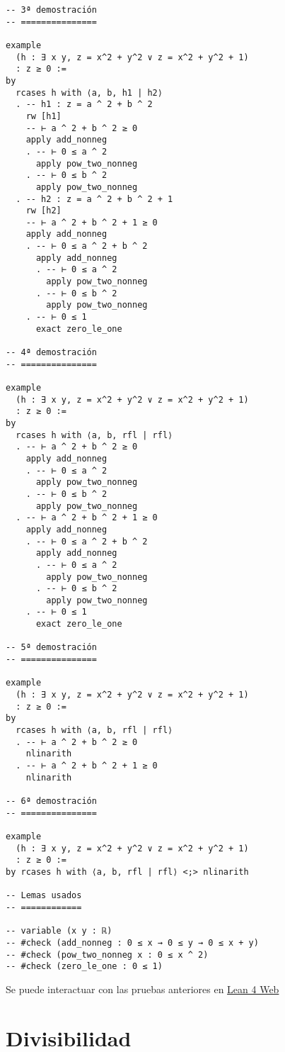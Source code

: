 \begin{verbatim}
-- 3ª demostración
-- ===============

example
  (h : ∃ x y, z = x^2 + y^2 ∨ z = x^2 + y^2 + 1)
  : z ≥ 0 :=
by
  rcases h with ⟨a, b, h1 | h2⟩
  . -- h1 : z = a ^ 2 + b ^ 2
    rw [h1]
    -- ⊢ a ^ 2 + b ^ 2 ≥ 0
    apply add_nonneg
    . -- ⊢ 0 ≤ a ^ 2
      apply pow_two_nonneg
    . -- ⊢ 0 ≤ b ^ 2
      apply pow_two_nonneg
  . -- h2 : z = a ^ 2 + b ^ 2 + 1
    rw [h2]
    -- ⊢ a ^ 2 + b ^ 2 + 1 ≥ 0
    apply add_nonneg
    . -- ⊢ 0 ≤ a ^ 2 + b ^ 2
      apply add_nonneg
      . -- ⊢ 0 ≤ a ^ 2
        apply pow_two_nonneg
      . -- ⊢ 0 ≤ b ^ 2
        apply pow_two_nonneg
    . -- ⊢ 0 ≤ 1
      exact zero_le_one

-- 4ª demostración
-- ===============

example
  (h : ∃ x y, z = x^2 + y^2 ∨ z = x^2 + y^2 + 1)
  : z ≥ 0 :=
by
  rcases h with ⟨a, b, rfl | rfl⟩
  . -- ⊢ a ^ 2 + b ^ 2 ≥ 0
    apply add_nonneg
    . -- ⊢ 0 ≤ a ^ 2
      apply pow_two_nonneg
    . -- ⊢ 0 ≤ b ^ 2
      apply pow_two_nonneg
  . -- ⊢ a ^ 2 + b ^ 2 + 1 ≥ 0
    apply add_nonneg
    . -- ⊢ 0 ≤ a ^ 2 + b ^ 2
      apply add_nonneg
      . -- ⊢ 0 ≤ a ^ 2
        apply pow_two_nonneg
      . -- ⊢ 0 ≤ b ^ 2
        apply pow_two_nonneg
    . -- ⊢ 0 ≤ 1
      exact zero_le_one

-- 5ª demostración
-- ===============

example
  (h : ∃ x y, z = x^2 + y^2 ∨ z = x^2 + y^2 + 1)
  : z ≥ 0 :=
by
  rcases h with ⟨a, b, rfl | rfl⟩
  . -- ⊢ a ^ 2 + b ^ 2 ≥ 0
    nlinarith
  . -- ⊢ a ^ 2 + b ^ 2 + 1 ≥ 0
    nlinarith

-- 6ª demostración
-- ===============

example
  (h : ∃ x y, z = x^2 + y^2 ∨ z = x^2 + y^2 + 1)
  : z ≥ 0 :=
by rcases h with ⟨a, b, rfl | rfl⟩ <;> nlinarith

-- Lemas usados
-- ============

-- variable (x y : ℝ)
-- #check (add_nonneg : 0 ≤ x → 0 ≤ y → 0 ≤ x + y)
-- #check (pow_two_nonneg x : 0 ≤ x ^ 2)
-- #check (zero_le_one : 0 ≤ 1)
\end{verbatim}
Se puede interactuar con las pruebas anteriores en \href{https://lean.math.hhu.de/\#url=https://raw.githubusercontent.com/jaalonso/Calculemus2/main/src/Desigualdad\_con\_rcases.lean.lean}{Lean 4 Web}

\chapter{Divisibilidad}
\label{sec:orgd93c2e5}

